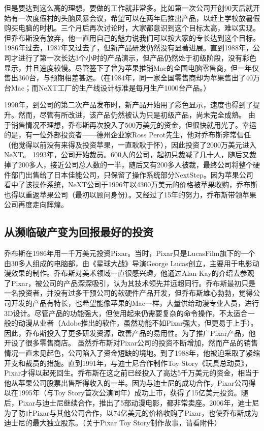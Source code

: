 但是要达到这么高的理想，要做的工作就非常多。比如第一次公司开创90天后就开始有一次度假村的头脑风暴会议，希望可以在两年后推出产品，以赶上学校放暑假购买电脑的时机。三个月后再次讨论时，大家都意识到这个目标太高，难以实现。但乔布斯没有放弃，他一直用自己的魅力说我们可以按大家的专长达到这个目标。
1986年过去，1987年又过去了，但新产品研发仍然没有显著进展。直到1988年，公司才进行了第一次长达3个小时的产品演示，但产品仍然处于初级阶段，没有彩色显示，并且速度较慢。尽管签下了曾为苹果推销Mac的全国电脑零售商，但一年仅售出360台，与预期相差甚远。（在1984年，同一家全国零售商却为苹果售出了40万台Mac；而NeXT工厂的生产线设计标准是每月生产1000台产品。）

1990年，到公司的第二次产品发布时，新产品开始用了彩色显示，速度也得到了提升。然而，尽管有所改进，该产品仍然被认为只是初级产品，尚未完全成熟。
由于销售情况不理想，乔布斯再次投入了500万美元的资金，但很快就用光了。幸运的是，有一位外部投资者——德州企业家Ross Perot先生，他对乔布斯非常信任（他觉得以前没有来得及投资苹果，一直耿耿于怀），因此投资了2000万美元进入NeXT。
1993年，公司开始裁员。600人的公司，起初只裁减了几十人，随后又裁掉了200多人，接近公司总人数的一半，随后又有200多人被裁，最终公司将整个硬件部门出售给了日本佳能公司，只保留了操作系统部分NextStep。因为苹果公司看中了该操作系统，NeXT公司于1996年以4300万美元的价格被苹果收购，乔布斯也得以重返苹果公司（最初以顾问身份）。又经过了15年的努力，乔布斯带领苹果公司再度走向辉煌。 

\hypertarget{ux516cux53f8ux5982ux4f55ux521bux65b0-1}{%
\subsection{从濒临破产变为回报最好的投资}\label{ux516cux53f8ux5982ux4f55ux521bux65b0-1}}

乔布斯在1986年用一千万美元投资Pixar。当时，Pixar只是LucasFilm旗下的一个由30多人组成的电脑部，由《星球大战》导演George Lucas创立，主要用于电影动漫效果的制作。乔布斯对美术领域一直很感兴趣，他通过Alan Kay的介绍去参观了Pixar，被公司的产品深深吸引，认为其技术领先并远超同行。乔布斯最初只是一名投资者，并没有过多干预公司的软硬件产品开发，但乔布斯雄心勃勃，觉得公司开发的产品有特长，也希望能像苹果的Mac一样，大量供给动漫专业人员，进行3D设计。尽管产品的功能强大，但使用起来仍需要复杂的命令操作，不太适合一般的动漫从业者（Adobe推出的软件，虽然功能不如Pixar强大，但更易于上手）。因此，乔布斯投入了更多研发资源，改善产品的易用性。为了推广Pixar产品，他开设了很多零售商店。
虽然乔布斯对Pixar公司的投资不断增加，然而产品的销售情况一直未见起色，公司陷入了资金短缺的境地。到了1988年，他被迫采取了紧缩开支和裁员的措施。直到1991年，与迪士尼合作制作Toy Story《玩具总动员》，Pixar才得以起死回生。乔布斯在这之前已经投入了高达5千万美元的资金，相当于他从苹果公司股票出售所得收入的一半。因为与迪士尼的成功合作，Pixar公司得以在1995年（与Toy Story首次公演同年）成功上市，获得了15亿美元投资。随后，Pixar与迪士尼继续合作，推出了5部动漫电影，都非常卖座。2006年，迪士尼为了防止Pixar与其他公司合作，以74亿美元的价格收购了Pixar，也使乔布斯成为迪士尼的最大独立股东。（关于Pixar Toy Story制作故事，请看附件） 


